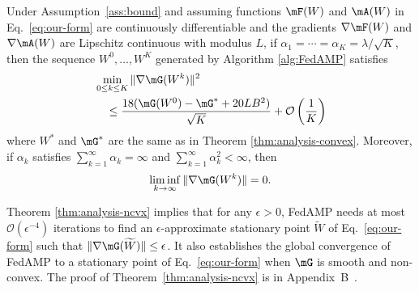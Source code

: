 \begin{thm}
\label{thm:analysis-ncvx}
Under Assumption~\ref{ass:bound} and assuming functions $\mF(W)$ and $\mA(W)$ in Eq.~\eqref{eq:our-form} are continuously differentiable and the gradients $\nabla\mF(W)$ and $\nabla \mA(W)$ are Lipschitz continuous with modulus $L$, 
if $\alpha_{1} = \cdots = \alpha_K = \lambda/\sqrt{K}$, then the sequence $W^0, \ldots, W^K$ generated by Algorithm \ref{alg:FedAMP} satisfies
\begin{equation}\nonumber
\begin{aligned}
& \min_{0\leq k\leq K} \|\nabla \mG(W^k)\|^2 \\ 
& \quad \leq \frac{18(\mG(W^0) - \mG^* + 20LB^2)}{\sqrt{K}} + \mathcal{O}\left(\frac{1}{K}\right)
\end{aligned}
\end{equation}
where $W^*$ and $\mG^*$ are the same as in Theorem \ref{thm:analysis-convex}. Moreover, if $\alpha_k$ satisfies $\sum_{k=1}^\infty\alpha_k = \infty$ and $\sum_{k=1}^\infty\alpha_k^2<\infty$, then
\begin{equation}
\nonumber
\liminf_{k\rightarrow\infty} \|\nabla\mG(W^k)\| = 0.
\end{equation} 
\end{thm}

Theorem \ref{thm:analysis-ncvx} implies that for any $\epsilon>0$, FedAMP needs at most $\mathcal{O}(\epsilon^{-4})$ iterations to find an $\epsilon$-approximate stationary point $\widetilde{W}$ of Eq.~\eqref{eq:our-form} such that $\|\nabla\mG(\widetilde{W})\|\leq \epsilon$. It also establishes the global convergence of FedAMP to a stationary point of Eq.~\eqref{eq:our-form} when $\mG$ is smooth and non-convex. The proof of Theorem~\ref{thm:analysis-ncvx} is in Appendix~B~\cite{huang2020personalized}.

